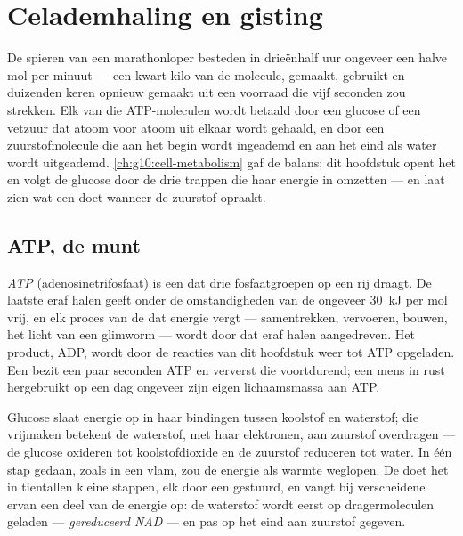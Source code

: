 \chapter{Celademhaling en gisting}\label{ch:g12:respiration-fermentation}

De spieren van een marathonloper besteden in drieënhalf uur ongeveer een
halve mol  per minuut --- een kwart kilo van de molecule, gemaakt,
gebruikt en duizenden keren opnieuw gemaakt uit een voorraad die vijf
seconden zou strekken. Elk van die ATP-moleculen wordt betaald door een
glucose of een vetzuur dat atoom voor atoom uit elkaar wordt gehaald, en
door een zuurstofmolecule die aan het begin wordt ingeademd en aan het
eind als water wordt uitgeademd. \cref{ch:g10:cell-metabolism} gaf de
balans; dit hoofdstuk opent het  en volgt de glucose door de
drie trappen die haar energie in  omzetten --- en laat zien wat een 
doet wanneer de zuurstof opraakt.

\section{ATP, de munt}

\begin{definition}[ATP]\label{def:g12:respiration-fermentation:atp}
\emph{ATP} (adenosinetrifosfaat) is een  dat drie
fosfaatgroepen op een rij draagt. De laatste eraf halen geeft onder de
omstandigheden van de  ongeveer \qty{30}{kJ} per mol vrij, en elk
proces van de  dat energie vergt --- samentrekken, vervoeren, bouwen,
het licht van een glimworm --- wordt door dat eraf halen aangedreven. Het
product, ADP, wordt door de reacties van dit hoofdstuk weer tot ATP
opgeladen. Een  bezit een paar seconden ATP en ververst die
voortdurend; een mens in rust hergebruikt op een dag ongeveer zijn eigen
lichaamsmassa aan ATP.
\end{definition}

\begin{proposition}\label{prop:g12:respiration-fermentation:oxidation}
Glucose slaat energie op in haar bindingen tussen koolstof en waterstof;
die vrijmaken betekent de waterstof, met haar elektronen, aan zuurstof
overdragen --- de glucose oxideren tot koolstofdioxide en de zuurstof
reduceren tot water. In één stap gedaan, zoals in een vlam, zou de energie
als warmte weglopen. De  doet het in tientallen kleine stappen, elk
door een  gestuurd, en vangt bij verscheidene ervan een deel van de
energie op: de waterstof wordt eerst op dragermoleculen geladen ---
\emph{gereduceerd NAD} --- en pas op het eind aan zuurstof gegeven.
\end{proposition}
\admitted

